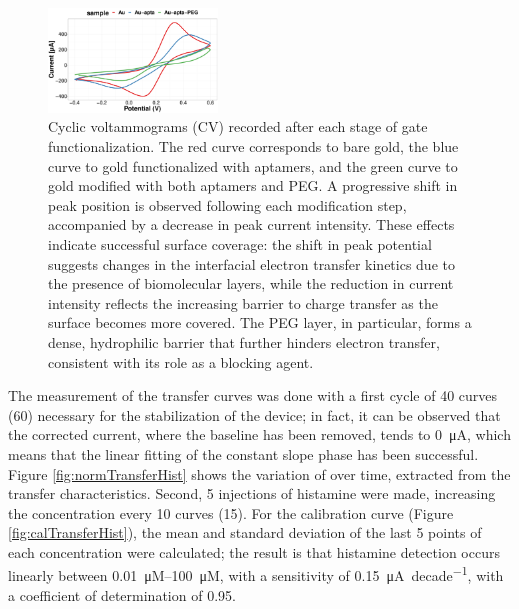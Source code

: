 \begin{figure}[hb]
    \centering
    \includegraphics[width = 0.4\textwidth]{figures/chapter4/histamine/CV_functionalization.pdf}
    \caption{Cyclic voltammograms (CV) recorded after each stage of gate functionalization. The red curve corresponds to bare gold, the blue curve to gold functionalized with aptamers, and the green curve to gold modified with both aptamers and PEG. A progressive shift in peak position is observed following each modification step, accompanied by a decrease in peak current intensity. These effects indicate successful surface coverage: the shift in peak potential suggests changes in the interfacial electron transfer kinetics due to the presence of biomolecular layers, while the reduction in current intensity reflects the increasing barrier to charge transfer as the surface becomes more covered. The PEG layer, in particular, forms a dense, hydrophilic barrier that further hinders electron transfer, consistent with its role as a blocking agent.}
    \label{fig:CVfunctionalization}
\end{figure}

The measurement of the transfer curves was done with a first cycle of 40 curves (\SI{60}{\min}) necessary for the stabilization of the device; in fact, it can be observed that the corrected current, where the baseline has been removed, tends to \SI{0}{\uA}, which means that the linear fitting of the constant slope phase has been successful. Figure \ref{fig:normTransferHist} shows the variation of \ion{} over time, extracted from the transfer characteristics.
Second, 5 injections of histamine were made, increasing the concentration every 10 curves (\SI{15}{\min}). For the calibration curve (Figure \ref{fig:calTransferHist}), the mean and standard deviation of the last 5 \ion{} points of each concentration were calculated; the result is that histamine detection occurs linearly between \SIrange{0.01}{100}{\micro M}, with a sensitivity of \SI{0.15}{\uA \per decade}, with a coefficient of determination of 0.95.

